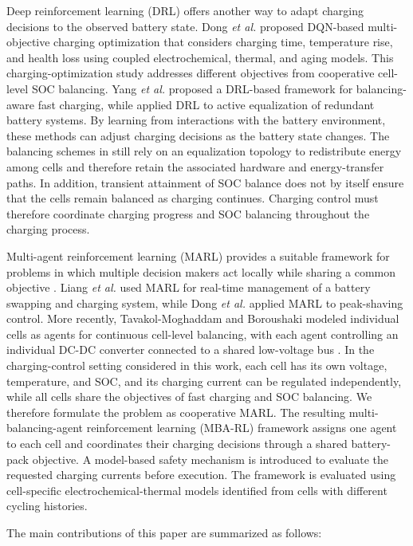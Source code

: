 \documentclass[10pt,journal,letterpaper]{IEEEtran}
\begin{document}
Deep reinforcement learning (DRL) offers another way to adapt charging decisions to the observed battery state. Dong {\it et al.} \cite{dong2025charging} proposed DQN-based multi-objective charging optimization that considers charging time, temperature rise, and health loss using coupled electrochemical, thermal, and aging models. This charging-optimization study addresses different objectives from cooperative cell-level SOC balancing. Yang {\it et al.} \cite{17} proposed a DRL-based framework for balancing-aware fast charging, while \cite{18} applied DRL to active equalization of redundant battery systems. By learning from interactions with the battery environment, these methods can adjust charging decisions as the battery state changes. The balancing schemes in \cite{17,18} still rely on an equalization topology to redistribute energy among cells and therefore retain the associated hardware and energy-transfer paths. In addition, transient attainment of SOC balance does not by itself ensure that the cells remain balanced as charging continues. Charging control must therefore coordinate charging progress and SOC balancing throughout the charging process.

Multi-agent reinforcement learning (MARL) provides a suitable framework for problems in which multiple decision makers act locally while sharing a common objective \cite{19, 20}. Liang {\it et al.} \cite{21} used MARL for real-time management of a battery swapping and charging system, while Dong {\it et al.} \cite{22} applied MARL to peak-shaving control. More recently, Tavakol-Moghaddam and Boroushaki modeled individual cells as agents for continuous cell-level balancing, with each agent controlling an individual DC-DC converter connected to a shared low-voltage bus \cite{tavakol2025marl}. In the charging-control setting considered in this work, each cell has its own voltage, temperature, and SOC, and its charging current can be regulated independently, while all cells share the objectives of fast charging and SOC balancing. We therefore formulate the problem as cooperative MARL. The resulting multi-balancing-agent reinforcement learning (MBA-RL) framework assigns one agent to each cell and coordinates their charging decisions through a shared battery-pack objective. A model-based safety mechanism is introduced to evaluate the requested charging currents before execution. The framework is evaluated using cell-specific electrochemical-thermal models identified from cells with different cycling histories.

The main contributions of this paper are summarized as follows:
\end{document}
